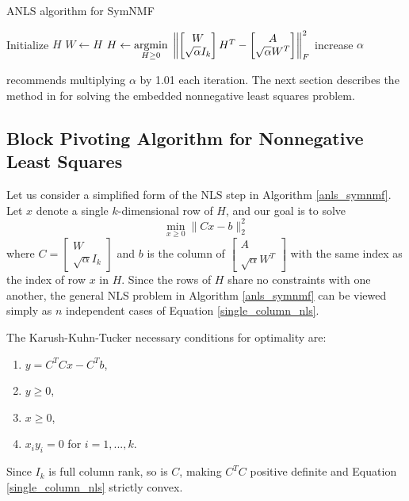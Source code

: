 \begin{algorithm}
\caption{ANLS algorithm for SymNMF}
\label{anls_symnmf}
\begin{algorithmic}[1]
\State Initialize $H$
\Repeat
  \State $W \gets H$
  \State $H \gets \underset{H \geq 0}{\mathrm{arg min}}\;
    \left\lVert \begin{bmatrix} W \\ \sqrt{\alpha} I_k \end{bmatrix} H^T
         - \begin{bmatrix} A \\ \sqrt{\alpha} W^T \end{bmatrix} \right\rVert_F^2$
  \State increase $\alpha$
\end{algorithmic}
\end{algorithm}

\cite{Kuang:15} recommends multiplying $\alpha$ by 1.01 each iteration.
The next section describes the method in \cite{Kim:11} for solving the
embedded nonnegative least squares problem.

\subsection{Block Pivoting Algorithm for Nonnegative Least Squares}
Let us consider a simplified form of the NLS step in Algorithm
\ref{anls_symnmf}. Let $x$ denote a single $k$-dimensional row of $H$,
and our goal is to solve
\begin{equation} \label{single_column_nls}
\min_{x \geq 0} \| C x - b \|_2^2
\end{equation}
where $C = \begin{bmatrix} W \\ \sqrt{\alpha} I_k \end{bmatrix}$ and
$b$ is the column of
$\begin{bmatrix} A \\ \sqrt{\alpha} W^T \end{bmatrix}$ with the same
index as the index of row $x$ in $H$. Since the rows of $H$ share no
constraints with one another, the general NLS problem in Algorithm
\ref{anls_symnmf} can be viewed simply as $n$ independent cases of
Equation \ref{single_column_nls}.

The Karush-Kuhn-Tucker necessary conditions for optimality are:
\begin{enumerate}
\item
$y = C^T C x - C^T b$,
\item
$y \geq 0$,
\item
$x \geq 0$,
\item
$x_i y_i = 0$ for $i = 1, ..., k$.
\end{enumerate}
Since $I_k$ is full column rank, so is $C$, making $C^T C$ positive
definite and Equation \ref{single_column_nls} strictly convex.

